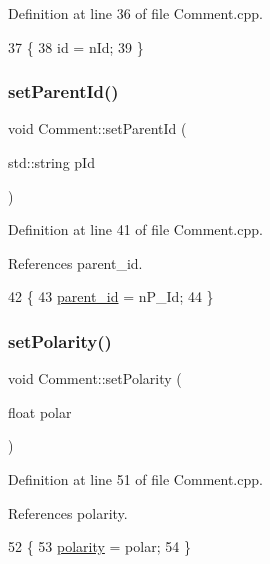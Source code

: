 Definition at line 36 of file Comment.\+cpp.


\begin{DoxyCode}
37 \{
38     \textcolor{keywordtype}{id} = nId;
39 \}
\end{DoxyCode}
\mbox{\label{class_comment_ac08d6d07afad5663c1d6c5886c7be333}} 
\subsubsection{\texorpdfstring{set\+Parent\+Id()}{setParentId()}}
{\footnotesize\ttfamily void Comment\+::set\+Parent\+Id (\begin{DoxyParamCaption}\item[{std\+::string}]{p\+Id }\end{DoxyParamCaption})}



Definition at line 41 of file Comment.\+cpp.



References parent\+\_\+id.


\begin{DoxyCode}
42 \{
43     \hyperlink{class_comment_abc88c0f64df05cb3d29ad1c7aa1621c5}{parent\_id} = nP\_Id;
44 \}
\end{DoxyCode}
\mbox{\label{class_comment_aa980db478aa7780f1094854e4df1bf4c}} 
\subsubsection{\texorpdfstring{set\+Polarity()}{setPolarity()}}
{\footnotesize\ttfamily void Comment\+::set\+Polarity (\begin{DoxyParamCaption}\item[{float}]{polar }\end{DoxyParamCaption})}



Definition at line 51 of file Comment.\+cpp.



References polarity.


\begin{DoxyCode}
52 \{
53     \hyperlink{class_comment_a617b67425b39c1f5f1eb0ada3d4bbd74}{polarity} = polar;
54 \}
\end{DoxyCode}
\mbox{\label{class_comment_ae6c057526fb2d3b789dfe99a0450f134}} 
